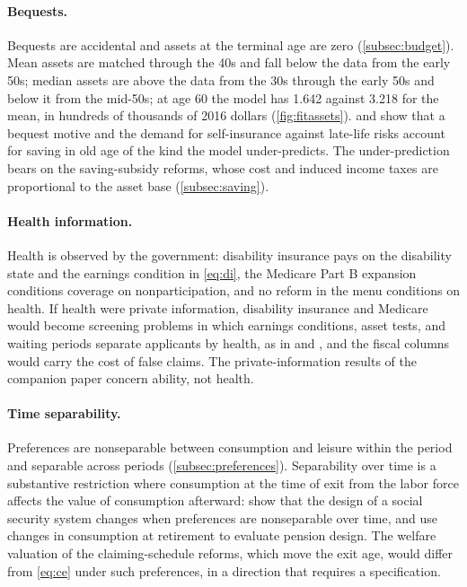 \paragraph{Bequests.}
Bequests are accidental and assets at the terminal age are zero (\autoref{subsec:budget}). Mean assets are matched through the 40s and fall below the data from the early 50s; median assets are above the data from the 30s through the early 50s and below it from the mid-50s; at age 60 the model has 1.642 against 3.218 for the mean, in hundreds of thousands of 2016 dollars (\autoref{fig:fitassets}). %
\citet{Denardi2010} and \citet{lockwood2018incidental} show that a bequest motive and the demand for self-insurance against late-life risks account for saving in old age of the kind the model under-predicts. The under-prediction bears on the saving-subsidy reforms, whose cost and induced income taxes are proportional to the asset base (\autoref{subsec:saving}).

\paragraph{Health information.}
Health is observed by the government: disability insurance pays on the disability state and the earnings condition in \eqref{eq:di}, the Medicare Part B expansion conditions coverage on nonparticipation, and no reform in the menu conditions on health. If health were private information, disability insurance and Medicare would become screening problems in which earnings conditions, asset tests, and waiting periods separate applicants by health, as in \citet{golosov2006designing} and \citet{Low2015}, and the fiscal columns would carry the cost of false claims. The private-information results of the companion paper \citep{ndiaye2026flexible} concern ability, not health.

\paragraph{Time separability.}
Preferences are nonseparable between consumption and leisure within the period and separable across periods (\autoref{subsec:preferences}). Separability over time is a substantive restriction where consumption at the time of exit from the labor force affects the value of consumption afterward: \citet{grochulski2010nonseparable} show that the design of a social security system changes when preferences are nonseparable over time, and \citet{kolsrud2024retirement} use changes in consumption at retirement to evaluate pension design. The welfare valuation of the claiming-schedule reforms, which move the exit age, would differ from \eqref{eq:ce} under such preferences, in a direction that requires a specification.

